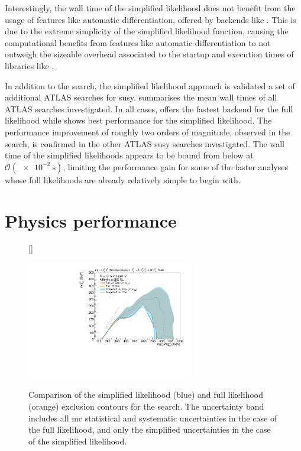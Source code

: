 Interestingly, the wall time of the simplified likelihood does not benefit from the usage of features like automatic differentiation, offered by backends like .
This is due to the extreme simplicity of the simplified likelihood function, causing the computational benefits from features like automatic differentiation to not outweigh the sizeable overhead associated to the startup and execution times of libraries like .

In addition to the \onelepton search, the simplified likelihood approach is validated a set of additional ATLAS searches for \gls{susy}.  summarises the mean wall times of all ATLAS searches investigated. In all cases,  offers the fastest backend for the full likelihood while  shows best performance for the simplified likelihood. The performance improvement of roughly two orders of magnitude, observed in the \onelepton search, is confirmed in the other ATLAS \gls{susy} searches investigated. The wall time of the simplified likelihoods appears to be bound from below at $\mathcal{O}(\SI{e-2}{\second})$, limiting the performance gain for some of the faster analyses whose full likelihoods are already relatively simple to begin with.


\section{Physics performance}\label{sec:physics_performance}

\begin{figure}
[\FBwidth]
{\caption{Comparison of the simplified likelihood (blue) and full likelihood (orange) exclusion contours for the \onelepton search. The uncertainty band includes all \gls{mc} statistical and systematic uncertainties in the case of the full likelihood, and only the simplified uncertainties in the case of the simplified likelihood.}\label{fig:results_simplify_1Lbb}}
{\includegraphics[width=0.65\textwidth]{exclusion_1Lbb_noLabel}}
\end{figure}

